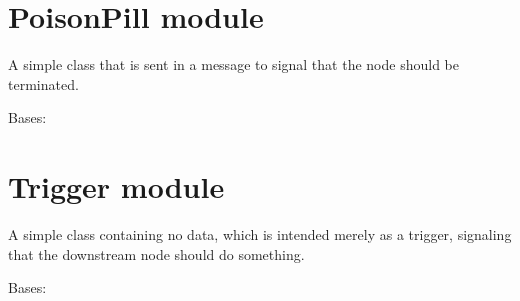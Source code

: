 \documentclass[letterpaper,10pt,english]{sphinxmanual}
\begin{document}
\label{\detokenize{api:module-nanostream.message.poison_pill}}

\section{PoisonPill module}
\label{\detokenize{api:poisonpill-module}}
A simple class that is sent in a message to signal that the node should be
terminated.

\begin{fulllineitems}
\label{\detokenize{api:nanostream.message.poison_pill.PoisonPill}}
Bases: 

\end{fulllineitems}

\label{\detokenize{api:module-nanostream.message.trigger}}

\section{Trigger module}
\label{\detokenize{api:trigger-module}}
A simple class containing no data, which is intended merely as a trigger,
signaling that the downstream node should do something.

\begin{fulllineitems}
\label{\detokenize{api:nanostream.message.trigger.Trigger}}
Bases: 

\end{fulllineitems}


\begin{fulllineitems}
\label{\detokenize{api:nanostream.message.trigger.hello_world}}
\end{fulllineitems}
\end{document}
